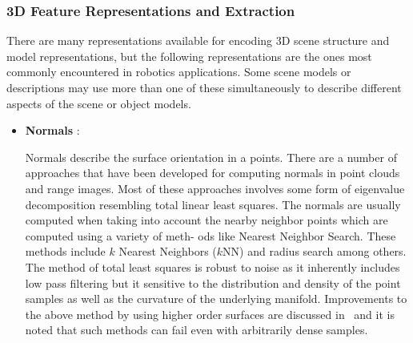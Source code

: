 \documentclass[twocolumn,oneside]{book}
\begin{document}
\subsubsection{3D Feature Representations and Extraction}\label{3d_feature_extraction.ch31}

There are many representations available for encoding 3D scene
structure and model representations, but the following representations
are the ones most commonly encountered in robotics applications. Some
scene models or descriptions may use more than one of these
simultaneously to describe different aspects of the scene or object
models.

\begin{itemize}

\item {\bf Normals }:

  Normals describe the surface orientation in a points. There are a
  number of approaches that have been developed for computing normals
  in point clouds and range images. Most of these approaches involves
  some form of eigenvalue decomposition resembling total linear least
  squares. The normals are usually computed when taking into account
  the nearby neighbor points which are computed using a variety of
  meth- ods like Nearest Neighbor Search. These methods include $k$
  Nearest Neighbors ($k$NN) and radius search among others. The method
  of total least squares is robust to noise as it inherently includes
  low pass filtering but it sensitive to the distribution and density
  of the point samples as well as the curvature of the underlying
  manifold. Improvements to the above method by using higher order
  surfaces are discussed in~\cite{Mitra_2003} and it is noted that
  such methods can fail even with arbitrarily dense samples.


\end{itemize}
\end{document}
